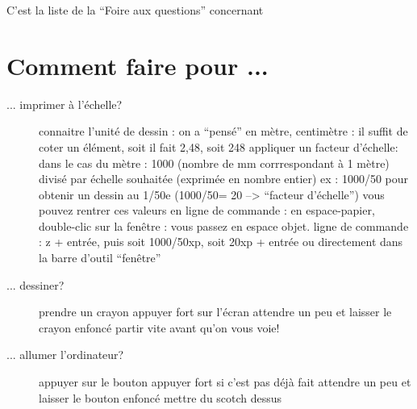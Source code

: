 \documentclass[a4paper,10pt,french]{sphinxmanual}
\begin{document}
C'est la liste de la ``Foire aux questions'' concernant 


\section{Comment faire pour ...}
\label{\detokenize{docs/refs/autocad-faq:comment-faire-pour}}\begin{description}
\item[{... imprimer à l'échelle?}] \leavevmode
connaitre l'unité de dessin : on a ``pensé'' en mètre, centimètre : il suffit de coter un élément, soit il fait 2,48, soit 248
appliquer un facteur d'échelle:
dans le cas du mètre : 1000 (nombre de mm corrrespondant à 1 mètre) divisé par échelle souhaitée (exprimée en nombre entier)
ex :  1000/50 pour obtenir un dessin au 1/50e (1000/50= 20 --\textgreater{} ``facteur d'échelle'')
vous pouvez rentrer ces valeurs en ligne de commande :
en espace-papier, double-clic sur la fenêtre : vous passez en espace objet.
ligne de commande : z +  entrée, puis soit 1000/50xp, soit 20xp + entrée
ou directement dans la barre d'outil ``fenêtre''

\item[{... dessiner?}] \leavevmode
prendre un crayon
appuyer fort sur l'écran
attendre un peu et laisser le crayon enfoncé
partir vite avant qu'on vous voie!

\item[{... allumer l'ordinateur?}] \leavevmode
appuyer sur le bouton
appuyer fort si c'est pas déjà fait
attendre un peu et laisser le bouton enfoncé
mettre du scotch dessus

\end{description}
\end{document}
